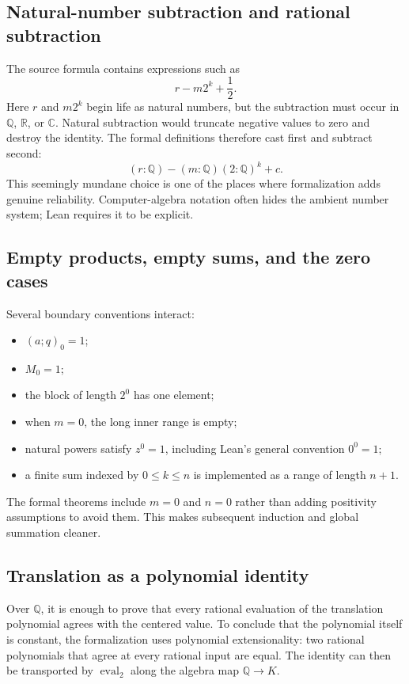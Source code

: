 \documentclass[11pt,oneside]{article}
\theoremstyle{definition}
\theoremstyle{remark}
\newcommand{\qpoch}[3]{\left(#1;#2\right)_{#3}}
\newcommand{\Q}{\mathbb Q}
\newcommand{\R}{\mathbb R}
\newcommand{\C}{\mathbb C}
\begin{document}
\subsection{Natural-number subtraction and rational subtraction}

The source formula contains expressions such as
\[
 r-m2^k+\frac12.
\]
Here $r$ and $m2^k$ begin life as natural numbers, but the subtraction must
occur in $\Q$, $\R$, or $\C$.  Natural subtraction would truncate negative
values to zero and destroy the identity.  The formal definitions therefore
cast first and subtract second:
\[
 (r:\Q)-(m:\Q)(2:\Q)^k+c.
\]
This seemingly mundane choice is one of the places where formalization adds
genuine reliability.  Computer-algebra notation often hides the ambient
number system; Lean requires it to be explicit.

\subsection{Empty products, empty sums, and the zero cases}

Several boundary conventions interact:
\begin{itemize}[leftmargin=2em]
\item $\qpoch{a}{q}{0}=1$;
\item $M_0=1$;
\item the block of length $2^0$ has one element;
\item when $m=0$, the long inner range is empty;
\item natural powers satisfy $z^0=1$, including Lean's general convention
$0^0=1$;
\item a finite sum indexed by $0\le k\le n$ is implemented as a range of
length $n+1$.
\end{itemize}
The formal theorems include $m=0$ and $n=0$ rather than adding positivity
assumptions to avoid them.  This makes subsequent induction and global
summation cleaner.

\subsection{Translation as a polynomial identity}

Over $\Q$, it is enough to prove that every rational evaluation of the
translation polynomial agrees with the centered value.  To conclude that
the polynomial itself is constant, the formalization uses polynomial
extensionality: two rational polynomials that agree at every rational input
are equal.  The identity can then be transported by
$\operatorname{eval}_2$ along the algebra map $\Q\to K$.
\end{document}
